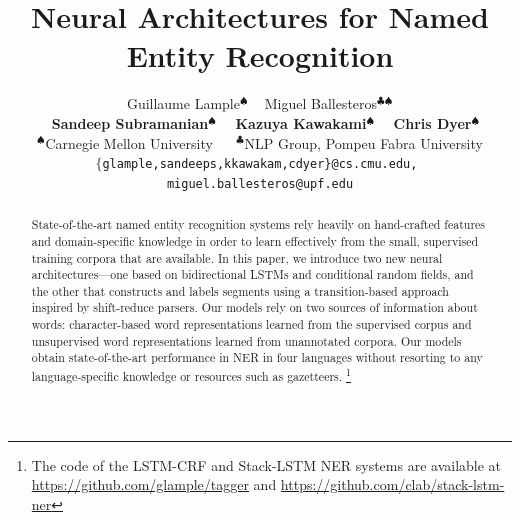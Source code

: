 \documentclass[11pt,letterpaper]{article}
\title{Neural Architectures for Named Entity Recognition}
\author{Guillaume Lample$^{\spadesuit}$ ~ Miguel Ballesteros$^{\clubsuit\spadesuit}$ \\ ~ \textbf{Sandeep Subramanian$^{\spadesuit}$ ~ Kazuya Kawakami$^\spadesuit$ ~ Chris Dyer$^{\spadesuit}$}\\
  $^\spadesuit$Carnegie Mellon University ~~ $^\clubsuit$NLP Group, Pompeu Fabra University \\
 { \tt $\{$glample,sandeeps,kkawakam,cdyer\}@cs.cmu.edu, } \\ { \tt  miguel.ballesteros@upf.edu}
}
\date{}
\begin{document}
\maketitle

\begin{abstract}
State-of-the-art named entity recognition systems rely heavily on hand-crafted features and domain-specific knowledge in order to learn effectively from the small, supervised training corpora that are available. In this paper, we introduce two new neural architectures---one based on bidirectional LSTMs and conditional random fields, and the other that constructs and labels segments using a transition-based approach inspired by shift-reduce parsers. Our models rely on two sources of information about words: character-based word representations learned from the supervised corpus and unsupervised word representations learned from unannotated corpora. Our models obtain state-of-the-art performance in NER in four languages without resorting to any language-specific knowledge or resources such as gazetteers. \footnote{The code of the  LSTM-CRF and Stack-LSTM NER systems are available at \url{https://github.com/glample/tagger} and \url{https://github.com/clab/stack-lstm-ner}
}
\end{abstract}

\end{document}

